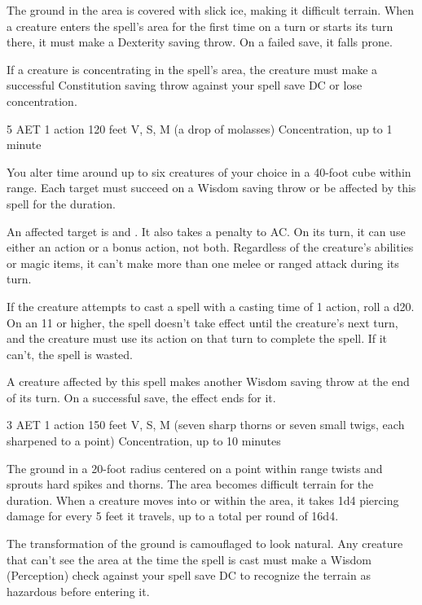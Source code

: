 The ground in the area is covered with slick ice, making it difficult terrain. When a creature enters the spell's area for the first time on a turn or starts its turn there, it must make a Dexterity saving throw. On a failed save, it falls prone.

If a creature is concentrating in the spell's area, the creature must make a successful Constitution saving throw against your spell save DC or lose concentration.


{5 AET}
{1 action}
{120 feet}
{V, S, M (a drop of molasses)}
{Concentration, up to 1 minute}

You alter time around up to six creatures of your choice in a 40-foot cube within range. Each target must succeed on a Wisdom saving throw or be affected by this spell for the duration.

An affected target is  and . It also takes a  penalty to AC. On its turn, it can use either an action or a bonus action, not both. Regardless of the creature's abilities or magic items, it can't make more than one melee or ranged attack during its turn.

If the creature attempts to cast a spell with a casting time of 1 action, roll a d20. On an 11 or higher, the spell doesn't take effect until the creature's next turn, and the creature must use its action on that turn to complete the spell. If it can't, the spell is wasted.

A creature affected by this spell makes another Wisdom saving throw at the end of its turn. On a successful save, the effect ends for it.


{3 AET}
{1 action}
{150 feet}
{V, S, M (seven sharp thorns or seven small twigs, each sharpened to a point)}
{Concentration, up to 10 minutes}

The ground in a 20-foot radius centered on a point within range twists and sprouts hard spikes and thorns. The area becomes difficult terrain for the duration. When a creature moves into or within the area, it takes 1d4 piercing damage for every 5 feet it travels, up to a total per round of 16d4.

The transformation of the ground is camouflaged to look natural. Any creature that can't see the area at the time the spell is cast must make a Wisdom (Perception) check against your spell save DC to recognize the terrain as hazardous before entering it.


